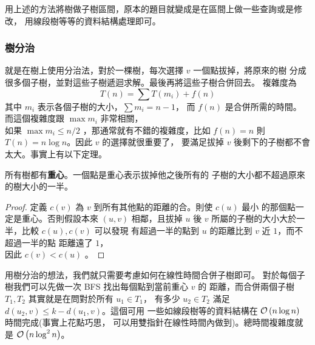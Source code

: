 \documentclass[a4paper,12pt]{book}
\begin{document}
用上述的方法將樹做子樹區間，原本的題目就變成是在區間上做一些查詢或是修改，
用線段樹等等的資料結構處理即可。

\subsubsection{樹分治}
就是在樹上使用分治法，對於一棵樹，每次選擇 $v$ 一個點拔掉，將原來的樹
分成很多個子樹，並對這些子樹遞迴求解。最後再將這些子樹合併回去。
複雜度為
\begin{equation}
  T(n) = \sum T(m_i) + f(n)
\end{equation}
其中 $m_i$ 表示各個子樹的大小，$\sum m_i = n - 1$，
而 $f(n)$ 是合併所需的時間。
而這個複雜度跟 $\max m_i$ 非常相關，\\
如果 $\max m_i \leq n / 2$ ，那通常就有不錯的複雜度，比如
$f(n) = n$ 則 $T(n) = n \log n$。因此 $v$ 的選擇就很重要了，
要滿足拔掉 $v$ 後剩下的子樹都不會太大。事實上有以下定理。

\begin{theorem}
  所有樹都有{\bf 重心}。一個點是重心表示拔掉他之後所有的
  子樹的大小都不超過原來的樹大小的一半。
\end{theorem}
\begin{proof}
  定義 $c(v)$ 為 $v$ 到所有其他點的距離的合。則使 $c(u)$ 最小
  的那個點一定是重心。否則假設本來 $(u, v)$ 相鄰，且拔掉 $u$ 
  後 $v$ 所屬的子樹的大小大於一半，比較 $c(u), c(v)$ 可以發現
  有超過一半的點到 $u$ 的距離比到 $v$ 近 $1$，而不超過一半的點
  距離遠了 $1$，\\因此 $c(v) < c(u)$ \contradict。
\end{proof}

用樹分治的想法，我們就只需要考慮如何在線性時間合併子樹即可。
對於每個子樹我們可以先做一次 BFS 找出每個點到當前重心 $v$ 的
距離，而合併兩個子樹 $T_1, T_2$ 其實就是在問對於所有 $u_1 \in T_1$，
有多少 $u_2 \in T_2$ 滿足 $d(u_2, v) \leq k - d(u_1, v)$。這個可用
一些如線段樹等的資料結構在 $\operatorname{\mathcal{O}}\left(n \log n\right)$ 時間完成(事實上花點巧思，
可以用雙指針在線性時間內做到)。總時間複雜度就是 $\operatorname{\mathcal{O}}\left(n \log^2 n\right)$。
\end{document}
